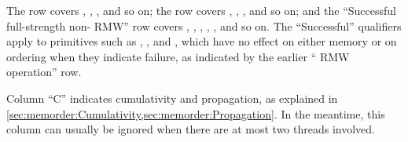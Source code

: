 The  row covers ,
, , and so on;
the  row covers ,
, , and so on; and
the ``Successful full-strength non- RMW'' row covers
, , ,
, , and so on.
The ``Successful'' qualifiers apply to primitives such as
, , and ,
which have no effect on either memory or on ordering when they indicate
failure, as indicated by the earlier `` RMW operation'' row.

Column ``C'' indicates cumulativity and propagation, as explained in
\cref{sec:memorder:Cumulativity,sec:memorder:Propagation}.
In the meantime, this column can usually be ignored when there
are at most two threads involved.

